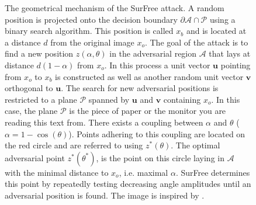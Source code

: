 \begin{figure}
\caption[Geometric configuration of SurFree]{The geometrical mechanism of the SurFree attack. A random position is projected onto the decision boundary $\partial\mathcal{A}\cap\mathcal{P}$ using a binary search algorithm. This position is called $x_b$ and is located at a distance $d$ from the original image $x_o$. The goal of the attack is to find a new position $z(\alpha,\theta)$ in the adversarial region $\mathcal{A}$ that lays at distance $d(1-\alpha)$ from $x_o$. In this process a unit vector $\mathbf{u}$ pointing from $x_o$ to $x_b$ is constructed as well as another random unit vector $\mathbf{v}$ orthogonal to $\mathbf{u}$. The search for new adversarial positions is restricted to a plane $\mathcal{P}$ spanned by $\mathbf{u}$ and $\mathbf{v}$ containing $x_o$. In this case, the plane $\mathcal{P}$ is the piece of paper or the monitor you are reading this text from. There exists a coupling between $\alpha$ and $\theta$ ($\alpha = 1 - \cos(\theta)$). Points adhering to this coupling are located on the red circle and are referred to using $z^*(\theta)$. The optimal adversarial point $z^*(\theta^*)$, is the point on this circle laying in $\mathcal{A}$ with the minimal distance to $x_o$, i.e. maximal $\alpha$. SurFree determines this point by repeatedly testing decreasing angle amplitudes until an adversarial position is found. The image is inspired by \cite{surfree}.}
\label{fig:surfree}
\end{figure}


